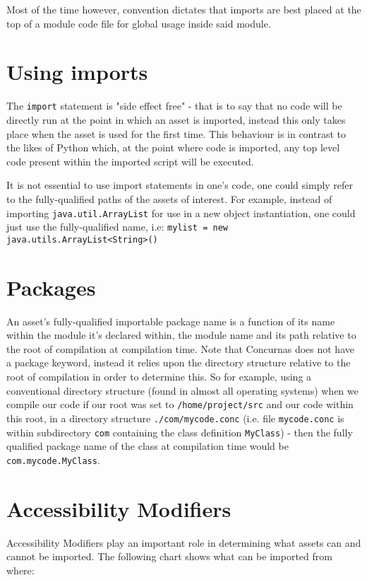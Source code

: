 \documentclass[conc-doc]{subfiles}
\begin{document}
Most of the time however, convention dictates that imports are best placed at the top of a module code file for global usage inside said module.

\section{Using imports}
The \lstinline{import} statement is "side effect free" - that is to say that no code will be directly run at the point in which an asset is imported, instead this only takes place when the asset is used for the first time. This behaviour is in contrast to the likes of Python which, at the point where code is imported, any top level code present within the imported script will be executed.

It is not essential to use import statements in one's code, one could simply refer to the fully-qualified paths of the assets of interest. For example, instead of importing \lstinline{java.util.ArrayList} for use in a new object instantiation, one could just use the fully-qualified name, i.e: \lstinline{mylist = new java.utils.ArrayList<String>()}

\section{Packages}
An asset's fully-qualified importable package name is a function of its name within the module it's declared within, the module name and its path relative to the root of compilation at compilation time. Note that Concurnas does not have a package keyword, instead it relies upon the directory structure relative to the root of compilation in order to determine this. So for example, using a conventional directory structure (found in almost all operating systems) when we compile our code if our root was set to \lstinline{/home/project/src} and our code within this root, in a directory structure \lstinline{./com/mycode.conc} (i.e. file \lstinline{mycode.conc} is within subdirectory \lstinline{com} containing the class definition \lstinline{MyClass}) - then the fully qualified package name of the class at compilation time would be \lstinline{com.mycode.MyClass}.

\section{Accessibility Modifiers}
Accessibility Modifiers play an important role in determining what assets can and cannot be imported. The following chart shows what can be imported from where:
\end{document}
